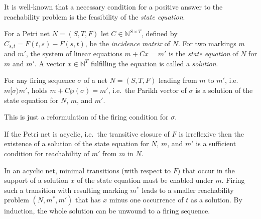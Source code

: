 \documentclass{LMCS}
\newcommand{\step}[1]{[#1\rangle}
\newcommand{\nat}{\mathbb{N}}
\newcommand{\parikh}{\wp}
\newcommand{\I}{C} \newcommand{\C}{{\ensuremath \Gamma}} \newcommand{\ord}{\ensuremath{\Omega}}
\begin{document}
It is well-known that a necessary condition for a positive
answer to the reachability problem is the feasibility of the {\em state equation}.

\begin{defi}
For a Petri net $N=(S,T,F)$ let $\I\in\nat^{S\times T}$, defined by $\I_{s,t}=F(t,s)-F(s,t)$, be the
{\em incidence matrix} of $N$. For two markings $m$ and $m'$, the system of linear equations
$m+\I x=m'$ is the {\em state equation} of $N$ for $m$ and $m'$. A vector $x\in \nat^T$ fulfilling
the equation is called a {\em solution}.
\end{defi}

\begin{prop}
For any firing sequence $\sigma$ of a net $N=(S,T,F)$ leading from $m$ to $m'$, i.e. $m\step{\sigma}m'$,
holds $m+\I\parikh(\sigma)=m'$, i.e.\ the Parikh vector of $\sigma$ is a solution of the state equation for
$N$, $m$, and $m'$. 
\end{prop}
This is just a reformulation of the firing condition for $\sigma$.

\begin{prop}
If the Petri net is acyclic, i.e.~the transitive closure of $F$ is irreflexive then the existence of a
solution of the state equation for $N$, $m$, and $m'$ is a sufficient condition for reachability of $m'$
from $m$ in $N$.
\end{prop}
In an acyclic net, minimal transitions (with respect to $F$) that occur in the support of a solution $x$ of the state equation
must be enabled under $m$. Firing such a transition with resulting marking $m^*$ leads to a smaller
reachability problem $(N,m^*,m')$ that has $x$ minus one occurrence of $t$ as a solution. By induction, the whole
solution can be unwound to a firing sequence.
\end{document}
